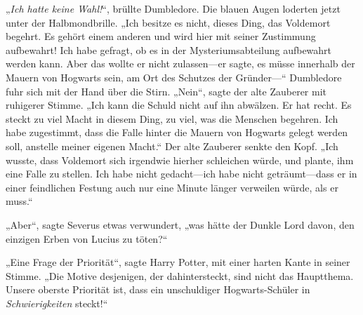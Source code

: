 „\emph{Ich hatte keine Wahl!}“, brüllte Dumbledore.
Die blauen Augen loderten jetzt unter der Halbmondbrille.
„Ich besitze es nicht, dieses Ding, das Voldemort begehrt. Es gehört einem anderen und wird hier mit seiner Zustimmung aufbewahrt! Ich habe gefragt, ob es in der Mysteriumsabteilung aufbewahrt werden kann. Aber das wollte er nicht zulassen—er sagte, es müsse innerhalb der Mauern von Hogwarts sein, am Ort des Schutzes der Gründer—“
Dumbledore fuhr sich mit der Hand über die Stirn.
„Nein“, sagte der alte Zauberer mit ruhigerer Stimme. „Ich kann die Schuld nicht auf ihn abwälzen. Er hat recht. Es steckt zu viel Macht in diesem Ding, zu viel, was die Menschen begehren. Ich habe zugestimmt, dass die Falle hinter die Mauern von Hogwarts gelegt werden soll, anstelle meiner eigenen Macht.“
Der alte Zauberer senkte den Kopf.
„Ich wusste, dass Voldemort sich irgendwie hierher schleichen würde, und plante, ihm eine Falle zu stellen. Ich habe nicht gedacht—ich habe nicht geträumt—dass er in einer feindlichen Festung auch nur eine Minute länger verweilen würde, als er muss.“

„Aber“, sagte Severus etwas verwundert, „was hätte der Dunkle Lord davon, den einzigen Erben von Lucius zu töten?“

„Eine Frage der Priorität“, sagte Harry Potter, mit einer harten Kante in seiner Stimme. „Die Motive desjenigen, der dahintersteckt, sind nicht das Hauptthema. Unsere oberste Priorität ist, dass ein unschuldiger Hogwarts-Schüler in \emph{Schwierigkeiten} steckt!“

